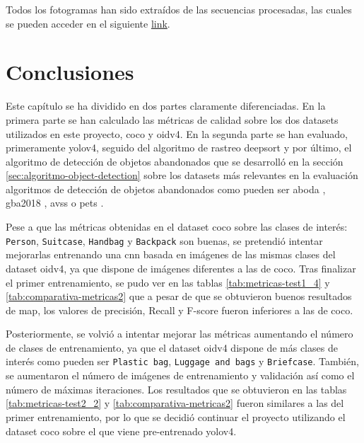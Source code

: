 Todos los fotogramas han sido extraídos de las secuencias procesadas, las cuales se pueden acceder en el siguiente \href{https://drive.google.com/drive/folders/1AA4KZCpsEW6MTdHJdu8mLKuGE1BCX9de?usp=sharing}{link}.

\newpage %

\section{Conclusiones}
\label{sec:conclu-resultados}

Este capítulo se ha dividido en dos partes claramente diferenciadas. En la primera parte se han calculado las métricas de calidad sobre los dos datasets utilizados en este proyecto, \gls{coco} y \gls{oidv4}. En la segunda parte se han evaluado, primeramente \gls{yolov4}, seguido del algoritmo de rastreo \gls{deepsort} y por último, el algoritmo de detección de objetos abandonados que se desarrolló en la sección \ref{sec:algoritmo-object-detection} sobre los datasets más relevantes en la evaluación algoritmos de detección de objetos abandonados como pueden ser \gls{aboda} \cite{aboda-dataset}, \gls{gba2018} \cite{gba-dataset}, \gls{avss} \cite{AVSSAB2007-dataset} o \gls{pets} \cite{pets2007-dataset}.

Pese a que las métricas obtenidas en el dataset \gls{coco} sobre las clases de interés: \texttt{Person}, \texttt{Suitcase}, \texttt{Handbag} y \texttt{Backpack} son buenas, se pretendió intentar mejorarlas entrenando una \gls{cnn} basada en imágenes de las mismas clases del dataset \gls{oidv4}, ya que dispone de imágenes diferentes a las de \gls{coco}. Tras finalizar el primer entrenamiento, se pudo ver en las tablas \ref{tab:metricas-test1_4} y \ref{tab:comparativa-metricas2} que a pesar de que se obtuvieron buenos resultados de \gls{map}, los valores de precisión, Recall y F-score fueron inferiores a las de \gls{coco}.

Posteriormente, se volvió a intentar mejorar las métricas aumentando el número de clases de entrenamiento, ya que el dataset \gls{oidv4} dispone de más clases de interés como pueden ser \texttt{Plastic bag}, \texttt{Luggage and bags} y \texttt{Briefcase}. También, se aumentaron el número de imágenes de entrenamiento y validación así como el número de máximas iteraciones. Los resultados que se obtuvieron en las tablas \ref{tab:metricas-test2_2}  y \ref{tab:comparativa-metricas2} fueron similares a las del primer entrenamiento, por lo que se decidió continuar el proyecto utilizando el dataset \gls{coco} sobre el que viene pre-entrenado \gls{yolov4}.

